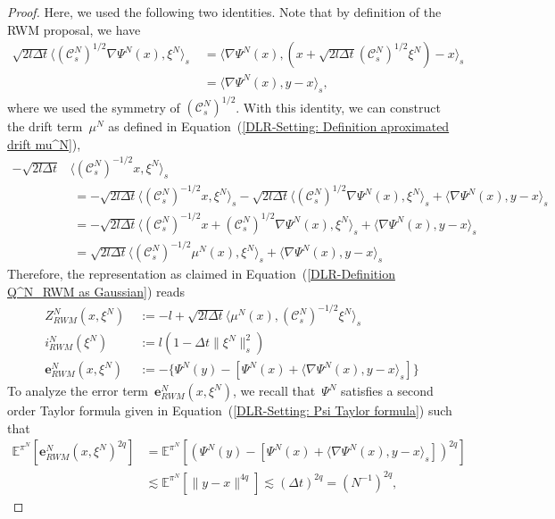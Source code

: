 \begin{proof}
Here, we used the following two identities. Note that by definition of the RWM proposal, we have
\begin{align*}
 \sqrt{2l \Delta t} \langle (\mathcal{C}^N_s)^{1/2} \nabla \Psi^N(x), \xi^N \rangle_s & \; = \langle  \nabla \Psi^N(x), ( x + \sqrt{2l \Delta t}  (\mathcal{C}^N_s)^{1/2} \xi^N )  -x \rangle_s \\
 & \; = \langle \nabla \Psi^N(x) , y - x \rangle_s,
\end{align*}
where we used the symmetry of $(\mathcal{C}^N_s)^{1/2}$. With this identity, we can construct the drift term~$\mu^N$ as defined in Equation~(\ref{DLR-Setting: Definition aproximated drift mu^N}),
\begin{align*}
 - \sqrt{2l \Delta t} & \langle  (\mathcal{C}^N_s)^{-1/2} x, \xi^N \rangle_s \\
 & \; = - \sqrt{2l \Delta t} \langle (\mathcal{C}^N_s)^{-1/2} x, \xi^N \rangle_s - \sqrt{2l \Delta t} \langle (\mathcal{C}^N_s)^{1/2} \nabla \Psi^N(x), \xi^N \rangle_s  + \langle \nabla \Psi^N(x), y - x\rangle_s \\
 & \; = - \sqrt{2l \Delta t} \langle (\mathcal{C}^N_s)^{-1/2} x + (\mathcal{C}^N_s)^{1/2} \nabla \Psi^N(x) , \xi^N \rangle_s  + \langle \nabla \Psi^N(x), y - x\rangle_s \\
 & \; =  \sqrt{2l \Delta t} \langle (\mathcal{C}^N_s)^{-1/2} \mu^N(x) , \xi^N \rangle_s  + \langle \nabla \Psi^N(x), y - x\rangle_s
\end{align*}
Therefore, the representation as claimed in Equation~(\ref{DLR-Definition Q^N_RWM as Gaussian}) reads
\begin{align}
 Z^N_{RWM} (x, \xi^N) & \; := - l + \sqrt{2l \Delta t} \langle  \mu^N(x) , (\mathcal{C}^N_s)^{-1/2} \xi^N \rangle_s \\
 i^N_{RWM}( \xi^N) & \; := l (1 -  \Delta t \| \xi^N\|_{s}^2) \\
 \textbf{e}^N_{RWM}(x, \xi^N) & \; := - \{  \Psi^N(y) - [ \Psi^N(x) + \langle \nabla \Psi^N(x), y - x\rangle_s ]\}
\end{align}
To analyze the error term~$\textbf{e}^N_{RWM}(x, \xi^N)$, we recall that~$\Psi^N$ satisfies a second order Taylor formula given in Equation~(\ref{DLR-Setting: Psi Taylor formula}) such that
\begin{align*}
  \mathbb{E}^{\pi^N}[\textbf{e}^N_{RWM}(x, \xi^N)^{2q}] & = \mathbb{E}^{\pi^N}[(\Psi^N(y) - [ \Psi^N(x) + \langle \nabla \Psi^N(x), y - x\rangle_s])^{2q}] \\
  & \lesssim \mathbb{E}^{\pi^N}[\| y-x \|^{4q}] \lesssim (\Delta t)^{2q} = (N^{-1})^{2q},

\end{align*}
\end{proof}
